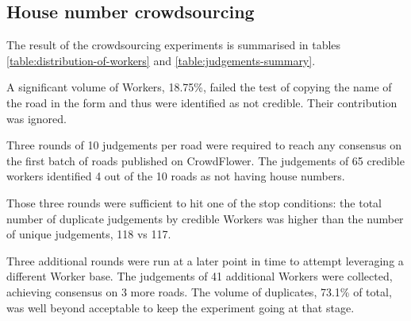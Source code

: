 \begin{figure}[!ht]
    \begin{floatrow}
   \end{floatrow}
\end{figure}

\subsection{House number crowdsourcing}

The result of the crowdsourcing experiments is summarised in tables \ref{table:distribution-of-workers} and \ref{table:judgements-summary}. 

A significant volume of Workers, 18.75\%, failed the test of copying the name of the road in the form and thus were identified as not credible. Their contribution was ignored.

Three rounds of 10 judgements per road were required to reach any consensus on the first batch of roads published on CrowdFlower. The judgements of 65 credible workers identified 4 out of the 10 roads as not having house numbers.

Those three rounds were sufficient to hit one of the stop conditions: the total number of duplicate judgements by credible Workers was higher than the number of unique judgements, 118 vs 117.

Three additional rounds were run at a later point in time to attempt leveraging a different Worker base. The judgements of 41 additional Workers were collected, achieving consensus on 3 more roads. The volume of duplicates,  73.1\% of total, was well beyond acceptable to keep the experiment going at that stage.

